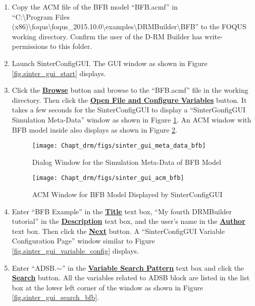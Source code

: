 \begin{enumerate}
	\item Copy the ACM file of the BFB model ``BFB.acmf'' in \\``C:\textbackslash Program Files (x86)\textbackslash foqus\textbackslash foqus\_2015.10.0\textbackslash examples\textbackslash DRMBuilder\textbackslash BFB'' to the FOQUS working directory.  Confirm the user of the D-RM Builder has write-permissions to this folder.
	\item Launch SinterConfigGUI.  The GUI window as shown in Figure \ref{fig.sinter_gui_start} displays.
	\item Click the \textbf{\underline{Browse}} button and browse to the ``BFB.acmf'' file in the working directory.  Then click the \textbf{\underline{Open File and Configure Variables}} button.  It takes a few seconds for the SinterConfigGUI to display a ``SinterGonfigGUI Simulation Meta-Data'' window as shown in Figure \ref{fig.sinter_gui_meta_data_bfb}.  An ACM window with BFB model inside also displays as shown in Figure \ref{fig.sinter_gui_acm_bfb}.
	\begin{figure}[H]
		\begin{center}
			\texttt{[image: Chapt\_drm/figs/sinter\_gui\_meta\_data\_bfb]}
			\caption{Dialog Window for the Simulation Meta-Data of BFB Model}
			\label{fig.sinter_gui_meta_data_bfb}
		\end{center}
	\end{figure}
	\begin{figure}[H]
		\begin{center}
			\texttt{[image: Chapt\_drm/figs/sinter\_gui\_acm\_bfb]}
			\caption{ACM Window for BFB Model Displayed by SinterConfigGUI}
			\label{fig.sinter_gui_acm_bfb}
		\end{center}
	\end{figure}
	\item Enter ``BFB Example'' in the \textbf{\underline{Title}} text box, ``My fourth DRMBuilder tutorial'' in the \textbf{\underline{Description}} text box, and the user's name in the \textbf{\underline{Author}} text box.  Then click the \textbf{\underline{Next}} button.  A ``SinterConfigGUI Variable Configuration Page'' window similar to Figure \ref{fig.sinter_gui_variable_config} displays.
	\item Enter ``ADSB.$\sim$'' in the \textbf{\underline{Variable Search Pattern}} text box and click the \textbf{\underline{Search}} button.  All the variables related to ADSB block are listed in the list box at the lower left corner of the window as shown in Figure \ref{fig.sinter_gui_search_bfb}.

\end{enumerate}
